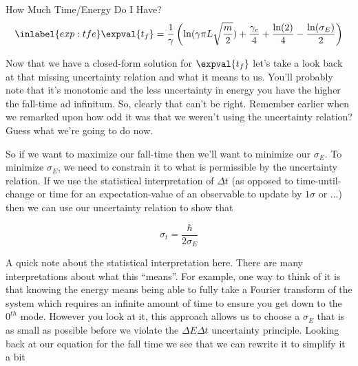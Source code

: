 \begin{answer}
\begin{answerpart}{How Much Time/Energy Do I Have?}
    \begin{equation}
      \inlabel{exp:tfe}
      \expval{t_f}
      =
      \frac{1}{\gamma}
      \left(
      \ln(\gamma \pi L \sqrt{\frac{m}{2}})
      +
      \frac{\gamma_e}{4}
      +
      \frac{\ln(2)}{4}
      -
      \frac{\ln(\sigma_E)}{2}
      \right)
    \end{equation}
    
    
    Now that we have a closed-form solution for $\expval{t_f}$ let's
    take a look back at that missing uncertainty relation and what it
    means to us.  You'll probably note that it's monotonic and the less
    uncertainty in energy you have the higher the fall-time ad
    infinitum.  So, clearly that can't be right.  Remember earlier
    when we remarked upon how odd it was that we weren't using the
    uncertainty relation?  Guess what we're going to do now.

    So if we want to maximize our fall-time then we'll want to
    minimize our $\sigma_E$.  To minimize $\sigma_E$, we need to
    constrain it to what is permissible by the uncertainty relation.
    If we use the statistical interpretation of $\Delta t$ (as opposed
    to time-until-change or time for an expectation-value of an
    observable to update by $1\sigma$ or ...)  then we can use our
    uncertainty relation to show that

    \begin{equation}
      \sigma_t = \frac{\hbar}{2\sigma_E}
    \end{equation}

    A quick note about the statistical interpretation here.  There are
    many interpretations about what this ``means''.  For example, one
    way to think of it is that knowing the energy means being able to
    fully take a Fourier transform of the system which requires an
    infinite amount of time to ensure you get down to the $0^{th}$
    mode. However you look at it, this
    approach allows us to choose a $\sigma_E$ that is as small as
    possible before we violate the $\Delta E \Delta t$ uncertainty
    principle.  Looking back at our equation for the fall time we see
    that we can rewrite it to simplify it a bit


\end{answerpart}
\end{answer}
